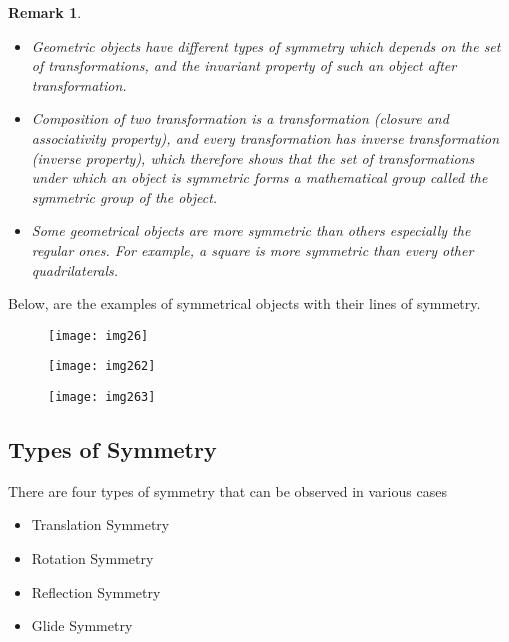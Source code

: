 \documentclass[a4paper, 12pt, openany]{report}
\newtheorem{rmk}{Remark}[section]
\begin{document}
	\begin{rmk}
		 \begin{itemize}
			\item [i.]Geometric objects have different types of symmetry which depends on the set of transformations, and the invariant property of such an object after transformation.
		\item[ii.]Composition of two transformation is a transformation (closure and associativity property), and every transformation has inverse transformation (inverse property), which therefore shows that the set of transformations under which an object is symmetric forms a  mathematical group called the symmetric group of the object.
	\item[iii.]Some geometrical objects are more symmetric than others especially the \linebreak regular ones. For example, a square is more symmetric than every other quadrilaterals.
	\end{itemize}
 \end{rmk} \newpage
Below, are the examples of symmetrical objects with their lines of \break symmetry.

\begin{figure}[H] \centering\texttt{[image: img26]}  \end{figure} 
\begin{figure} [H]\centering\texttt{[image: img262]}  \end{figure} 
\begin{figure}[H]\centering \texttt{[image: img263]}  \end{figure} 

	
\subsection*{Types of Symmetry}
	There are four types of symmetry that can  be observed in various cases\\
	\begin{itemize}\item [(1.)] Translation Symmetry
		\item [(2.)] Rotation Symmetry 
        \item [(3.)] Reflection Symmetry 
        \item [(4.)] Glide Symmetry \end{itemize}
	
\end{document}
